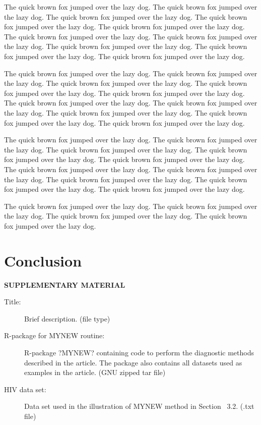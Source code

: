 \documentclass[12pt]{article}
\begin{document}
The quick brown fox jumped over the lazy dog.
The quick brown fox jumped over the lazy dog.
The quick brown fox jumped over the lazy dog.
The quick brown fox jumped over the lazy dog.
The quick brown fox jumped over the lazy dog.
The quick brown fox jumped over the lazy dog.
The quick brown fox jumped over the lazy dog.
The quick brown fox jumped over the lazy dog.
The quick brown fox jumped over the lazy dog.
The quick brown fox jumped over the lazy dog.

The quick brown fox jumped over the lazy dog.
The quick brown fox jumped over the lazy dog.
The quick brown fox jumped over the lazy dog.
The quick brown fox jumped over the lazy dog.
The quick brown fox jumped over the lazy dog.
The quick brown fox jumped over the lazy dog.
The quick brown fox jumped over the lazy dog.
The quick brown fox jumped over the lazy dog.
The quick brown fox jumped over the lazy dog.
The quick brown fox jumped over the lazy dog.

The quick brown fox jumped over the lazy dog.
The quick brown fox jumped over the lazy dog.
The quick brown fox jumped over the lazy dog.
The quick brown fox jumped over the lazy dog.
The quick brown fox jumped over the lazy dog.
The quick brown fox jumped over the lazy dog.
The quick brown fox jumped over the lazy dog.
The quick brown fox jumped over the lazy dog.
The quick brown fox jumped over the lazy dog.
The quick brown fox jumped over the lazy dog.

The quick brown fox jumped over the lazy dog.
The quick brown fox jumped over the lazy dog.
The quick brown fox jumped over the lazy dog.
The quick brown fox jumped over the lazy dog.



\section{Conclusion}
\label{sec:conc}


\bigskip
\begin{center}
{\large\bf SUPPLEMENTARY MATERIAL}
\end{center}

\begin{description}

\item[Title:] Brief description. (file type)

\item[R-package for  MYNEW routine:] R-package ?MYNEW? containing code to perform the diagnostic methods described in the article. The package also contains all datasets used as examples in the article. (GNU zipped tar file)

\item[HIV data set:] Data set used in the illustration of MYNEW method in Section~ 3.2. (.txt file)

\end{description}
\end{document}
